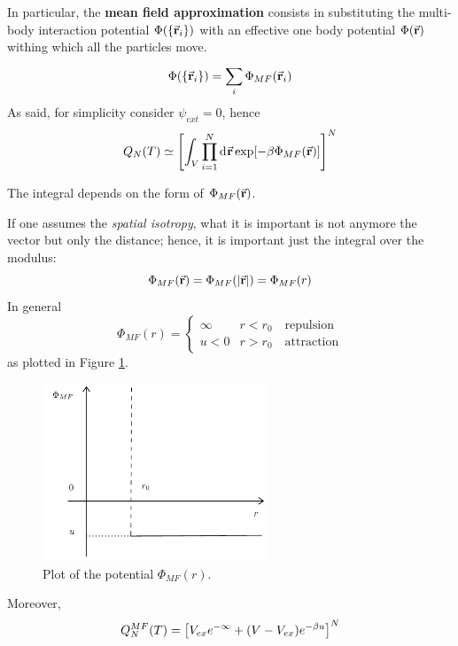 \documentclass[../main/main.tex]{subfiles}
\begin{document}
In particular, the \textbf{mean field approximation}  consists in substituting the multi-body interaction potential \(   \Phi (\{ \va{r}_i \}  ) \) with an effective one body potential \( \Phi (\va{r}) \) withing which all the particles move.
\begin{equation}
\Phi (\{ \va{r}_i \})   =\sum_{i}^{} \Phi _{MF} (\va{r}_i)
\end{equation}
As said, for simplicity consider \( \psi _{ext} = 0 \), hence
\begin{equation}
  Q_N (T) \simeq \qty[  \int_{V}^{} \prod_{i=1}^{N}  \dd[]{\va{r}}  \exp [-\beta \Phi _{MF} (\va{r})  ] ]^N
\end{equation}
\begin{remark}
The integral depends on the form of \( \Phi _{MF} (\va{r})  \).
\end{remark}
If one assumes the \emph{spatial isotropy},
what it is important is not anymore the vector but only the distance; hence, it is important just the integral over the modulus:
\begin{equation}
    \Phi _{MF} (\va{r}) = \Phi _{MF} (\abs{\va{r}} ) = \Phi _{MF} (r)
\end{equation}
In general
\begin{equation}
\Phi _{MF} (r) =
  \begin{cases}
   \infty & r < r_0 \quad  \text{repulsion}\\
   u < 0 & r> r_0  \quad \text{attraction}
  \end{cases}
\end{equation}
as plotted in Figure \ref{fig:14_1}.
\begin{figure}[h!]
\centering
\includegraphics[width=0.6\textwidth]{../lessons/14_image/1.pdf}
\caption{\label{fig:14_1} Plot of the potential \( \Phi _{MF} (r) \).}
\end{figure}
Moreover,
\begin{equation}
  Q_N^{MF} (T) = \qty[ V_{ex}e^{- \infty } + (V-V_{ex})e^{-\beta u} ]^N
\end{equation}
\end{document}
